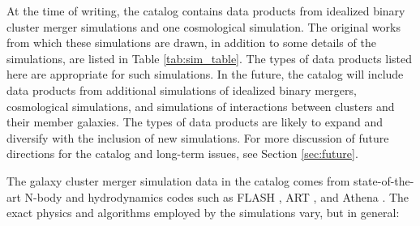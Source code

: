 \documentclass{emulateapj}
\begin{document}
At the time of writing, the catalog contains data products from idealized binary cluster merger simulations and one cosmological simulation. The original works from which these simulations are drawn, in addition to some details of the simulations, are listed in Table \ref{tab:sim_table}. The types of data products listed here are appropriate for such simulations. In the future, the catalog will include data products from additional simulations of idealized binary mergers, cosmological simulations, and simulations of interactions between clusters and their member galaxies. The types of data products are likely to expand and diversify with the inclusion of new simulations. For more discussion of future directions for the catalog and long-term issues, see Section \ref{sec:future}.



The galaxy cluster merger simulation data in the catalog comes from state-of-the-art N-body and hydrodynamics codes such as FLASH \citep{dub09}, ART \citep{kra99, kra02, rud08}, and Athena \citep{sto08}. The exact physics and algorithms employed by the simulations vary, but in general:
\end{document}
